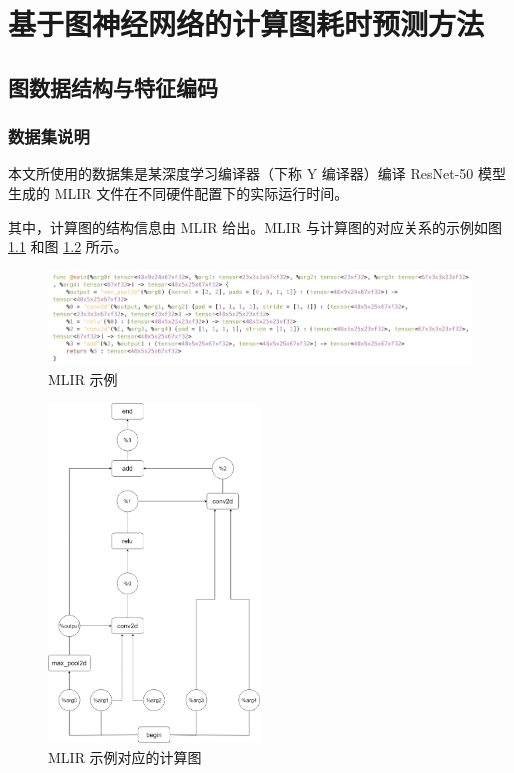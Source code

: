 
\chapter{基于图神经网络的计算图耗时预测方法}

\section{图数据结构与特征编码}

\subsection{数据集说明}

本文所使用的数据集是某深度学习编译器（下称 Y 编译器）编译 ResNet-50 \cite{resnet} 模型生成的 MLIR 文件在不同硬件配置下的实际运行时间。

其中，计算图的结构信息由 MLIR \cite{mlir} 给出。MLIR 与计算图的对应关系的示例如图 \ref{fig:graph5} 和图 \ref{fig:graph6} 所示。

\begin{figure}[h]
    \centering
    \includegraphics[width=1\textwidth]{figures/mlir.png}
    \caption{MLIR 示例 \cite{mlir_example}}
    \label{fig:graph5}
\end{figure}

\begin{figure}[h]
    \centering
    \includegraphics[width=0.5\textwidth]{figures/mlir_cg.png}
    \caption{MLIR 示例对应的计算图}
    \label{fig:graph6}
\end{figure}

